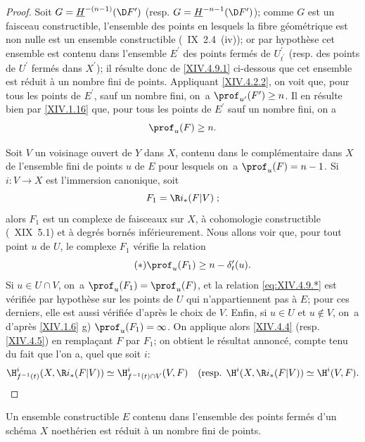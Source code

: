 \begin{proof}
Soit $G=\underline{H}^{-(n-1)}(\D F^{\prime})$ (resp. $G=\underline{H}^{-n-1}(\D F^{\prime})$); comme $G$ est un faisceau constructible, l'ensemble des points en lesquels la fibre g\'eom\'etrique est non nulle est un ensemble constructible (~IX~2.4~\textup{(iv)}); or par hypoth\`ese cet ensemble est contenu dans l'ensemble $E^{\prime}$ des points ferm\'es de $U_{t^{\prime}}^{\prime}$ (resp. des points de $U^{\prime}$ ferm\'es dans $X^{\prime}$); il r\'esulte donc de \ref{XIV.4.9.1} ci-dessous que cet ensemble est r\'eduit \`a un nombre fini de points. Appliquant \ref{XIV.4.2.2}, on voit que, pour tous les points de $E^{\prime}$, sauf un nombre fini, on~a $\prof_{u^{\prime}}(F^{\prime})\geq n$. Il en r\'esulte bien par \ref{XIV.1.16} que, pour tous les points de $E^{\prime}$ sauf un nombre fini, on a
$$
\prof_{u}(F)\geq n.
$$

Soit $V$ un voisinage ouvert de $Y$ dans $X$, contenu dans le compl\'ementaire dans $X$ de l'ensemble fini de points $u$ de $E$ pour lesquels on~a $\prof_{u}(F)=n-1$. Si $i\colon V\to X$ est l'immersion canonique, soit
$$F_{1}=\R i_{\ast}(F{|V})\;;$$
alors $F_{1}$ est un complexe de faisceaux sur $X$, \`a cohomologie constructible (~XIX~5.1) et \`a degr\'es born\'es inf\'erieurement. Nous allons voir que, pour tout point $u$ de $U$, le complexe $F_{1}$ v\'erifie la relation
\begin{equation*} \label{eq:XIV.4.9.*} \tag{$*$}
\prof_{u}(F_{1})\geq n-\delta_{t}^{\prime}(u).
\end{equation*}
Si $u\in U\cap V$, on~a $\prof_{u}(F_{1})=\prof_{u}(F)$, et la
relation \eqref{eq:XIV.4.9.*} est v\'erifi\'ee par hypoth\`ese sur les
points de $U$ qui n'appartiennent pas \`a $E$; pour ces derniers,
elle est aussi v\'erifi\'ee d'apr\`es le choix de $V$. Enfin, si $u\in
U$ et $u\not\in V$, on~a d'apr\`es \ref{XIV.1.6} g)
$\prof_{u}(F_{1})=\infty$. On applique alors \ref{XIV.4.4} (resp.
\ref{XIV.4.5}) en rempla\c cant $F$ par $F_{1}$; on obtient le
r\'esultat annonc\'e, compte tenu du fait que l'on a, quel que soit
$i$:
$$
\H_{f^{-1}(t)}^{i}(X, \R i_{\ast}(F{|V}))\simeq\H_{f^{-1}(t)\cap V}^{i}(V, F)\quad(\textrm{resp. }\H^{i}(X, \R i_{\ast}(F{|V}))\simeq\H^{i}(V, F).
$$
\skipqed
\end{proof}

\begin{sublemme} \label{XIV.4.9.1} Un ensemble constructible $E$ contenu dans l'ensemble des points ferm\'es d'un sch\'ema $X$ noeth\'erien est r\'eduit \`a un nombre fini de points.
\end{sublemme}

